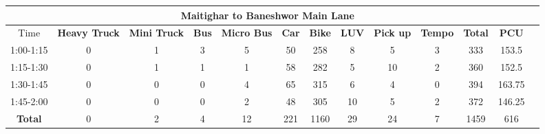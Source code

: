 \begin{landscape}
\begin{table}[h!]
\vspace{0.5cm}
\begin{tabular}{|c|c|c|c|c|c|c|c|c|c|c|c|c|}
    \hline
    \multicolumn{12}{|c|}{\textbf{Maitighar to Baneshwor Main Lane}} \\
    \hline
        Time & \textbf{Heavy Truck} & \textbf{Mini Truck} & \textbf{Bus} & \textbf{Micro Bus} & \textbf{Car} & \textbf{Bike} & \textbf{LUV} & \textbf{Pick up} & \textbf{Tempo} & \textbf{\textbf{Total}} & \textbf{PCU} \\
    \hline
1:00-1:15	&0	&1	&3	&5	&50	&258	&8	&5	&3	&333	&153.5 \\ \hline
1:15-1:30	&0	&1	&1	&1	&58	&282	&5	&10	&2	&360	&152.5 \\ \hline
1:30-1:45	&0	&0	&0	&4	&65	&315	&6	&4	&0	&394	&163.75 \\ \hline
1:45-2:00	&0	&0	&0	&2	&48	&305	&10	&5	&2	&372	&146.25 \\ \hline
\textbf{Total}	&0	&2	&4	&12	&221	&1160	&29	&24	&7	&1459	&616 \\ \hline

\end{tabular}

\end{table}
\end{landscape}


